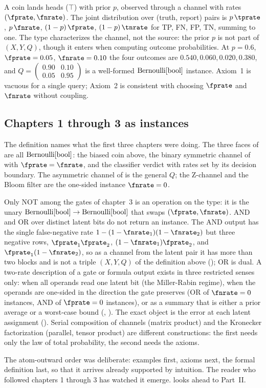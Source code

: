 \begin{example}
\label{ex:biased-coin-formal}
A coin lands heads ($\top$) with prior $p$, observed through a channel with
rates $(\fprate, \fnrate)$. The joint distribution over (truth, report) pairs is
$p\,\tprate$, $p\,\fnrate$, $(1-p)\,\fprate$, $(1-p)\,\tnrate$ for TP, FN, FP,
TN, summing to one. The type characterizes the channel, not the source: the
prior $p$ is not part of $(X, Y, Q)$, though it enters when computing outcome
probabilities. At $p = 0.6$, $\fprate = 0.05$, $\fnrate = 0.10$ the four
outcomes are $0.540, 0.060, 0.020, 0.380$, and $Q = \left(\begin{smallmatrix}
0.90 & 0.10 \\ 0.05 & 0.95 \end{smallmatrix}\right)$ is a well-formed
$\mathrm{Bernoulli}[\mathrm{bool}]$ instance. Axiom~1 is vacuous for a single query;
Axiom~2 is consistent with choosing $\fprate$ and $\fnrate$ without coupling.
\end{example}

\subsection*{Chapters 1 through 3 as instances}

The definition names what the first three chapters were doing. The three faces
of  are all $\mathrm{Bernoulli}[\mathrm{bool}]$: the biased coin
above, the binary symmetric channel of  with $\fprate = \fnrate$,
and the classifier verdict with rates set by its decision boundary. The
asymmetric channel of  is the general $Q$; the
Z-channel and the Bloom filter are the one-sided instance $\fnrate = 0$.

Only NOT among the gates of chapter~3 is an operation on the type: it is the
unary $\mathrm{Bernoulli}[\mathrm{bool}] \to \mathrm{Bernoulli}[\mathrm{bool}]$ that swaps
$(\fprate, \fnrate)$. AND and OR over distinct latent bits do not return an
instance. The AND output has the single false-negative rate $1 - (1 -
\fnrate_1)(1 - \fnrate_2)$ but three negative rows, $\fprate_1\fprate_2$,
$(1 - \fnrate_1)\fprate_2$, and $\fprate_1(1 - \fnrate_2)$, so as a channel from
the latent pair it has more than two blocks and is not a triple $(X, Y, Q)$ of
the definition above (); OR is dual. A two-rate
description of a gate or formula output exists in three restricted senses only:
when all operands read one latent bit (the Miller-Rabin regime), when the
operands are one-sided in the direction the gate preserves (OR of $\fnrate =
0$ instances, AND of $\fprate = 0$ instances), or as a summary that is either
a prior average or a worst-case bound (,
). The exact object is the error at each
latent assignment (). Serial composition of
channels (matrix product) and the Kronecker factorization (parallel, tensor
product) are different constructions: the first needs only the law of total
probability, the second needs the axioms.

The atom-outward order was deliberate: examples first, axioms next, the formal
definition last, so that it arrives already supported by intuition. The reader
who followed chapters 1 through 3 has watched it emerge. 
looks ahead to Part~II.
